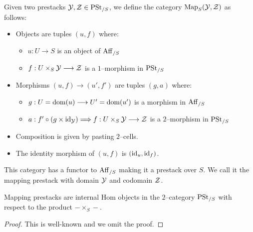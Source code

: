 \documentclass[11pt]{amsart}
\begin{document}
\begin{defn}
Given two prestacks $\mathcal{Y}, \mathcal{Z} \in \mathrm{PSt}_{/S}$, we define the category
$\mathrm{Map}_S(\mathcal{Y}, \mathcal{Z})$ as follows:
\begin{itemize}
\item Objects are tuples $(u, f)$ where:
  \begin{itemize}
  \item $u : U \to S$ is an object of $\mathrm{Aff}_{/S}$
  \item $f : U \times_S \mcY \to \mcZ$ is a $1$--morphism in $\mathrm{PSt}_{/S}$
  \end{itemize}
\item Morphisms $(u, f) \to (u', f')$ are tuples $(g, a)$ where:
  \begin{itemize}
  \item $g : U = \dom(u) \to U' = \dom(u')$ is a morphism in $\mathrm{Aff}_{/S}$
  \item $a : f' \circ (g \times \id_\mcY) \To f : U \times_S \mcY \to \mcZ$
    is a $2$--morphism in $\mathrm{PSt}_{/S}$
  \end{itemize}
\item Composition is given by pasting $2$--cells.
\item The identity morphism of $(u, f)$ is $(\mathrm{id}_u, \mathrm{id}_f)$.
\end{itemize}
This category has a functor to $\mathrm{Aff}_{/S}$ making it a prestack over $S$.
We call it the mapping prestack with domain $\mathcal{Y}$ and codomain $\mathcal{Z}$.
\end{defn}

\begin{prop}
Mapping prestacks are internal Hom objects in the $2$--category $\mathrm{PSt}_{/S}$
with respect to the product $- \times_S -$.
\end{prop}
\begin{proof}
This is well-known and we omit the proof.
\end{proof}
\end{document}
